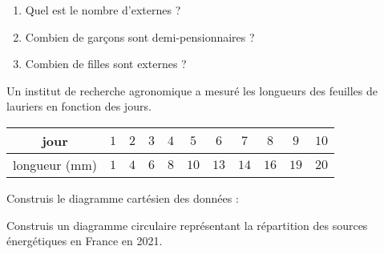 \begin{pageParcoursd}
\begin{enumerate}[leftmargin=*]
 \item Quel est le nombre d'externes ?  
 \item Combien de garçons sont demi-pensionnaires ?  
 \item Combien de filles sont externes ? 
\end{enumerate}


\end{pageParcoursd}

\begin{pageParcourst}

 
Un institut de recherche agronomique a mesuré les longueurs des feuilles de lauriers en fonction des jours.

 \begin{center}
 \begin{tabular}{|c|c|c|c|c|c|c|c|c|c|c|} \hline
  jour  & $1$ & $2$ & $3$ & $4$ & $5$ & $6$ & $7$ & $8$ & $9$ & $10$   \\  \hline
  longueur (mm) & $1$ & $4$ & $6$ & $8$ & $10$ & $13$& $14$ & $16$ &$19$ &$20$\\\hline
 \end{tabular}
 \end{center}
 
 Construis le diagramme cartésien des données :
 
 


 Construis un diagramme circulaire représentant la répartition des sources énergétiques en France en 2021.

 \begin{minipage}{0.6\linewidth}


\end{minipage}
\end{pageParcourst}
